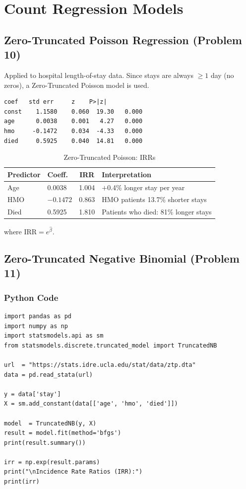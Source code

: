\documentclass[12pt,a4paper]{article}
\begin{document}
\section{Count Regression Models}

\subsection{Zero-Truncated Poisson Regression (Problem 10)}

Applied to hospital length-of-stay data. Since stays are always $\geq 1$ day (no zeros), a Zero-Truncated Poisson model is used.

\begin{lstlisting}[style=outputstyle]
          coef   std err     z    P>|z|
const    1.1580    0.060  19.30   0.000
age      0.0038    0.001   4.27   0.000
hmo     -0.1472    0.034  -4.33   0.000
died     0.5925    0.040  14.81   0.000
\end{lstlisting}

\begin{table}[H]
  \centering
  \caption{Zero-Truncated Poisson: IRRs}
  \begin{tabular}{llcl}
    \toprule
    \textbf{Predictor} & \textbf{Coeff.} & \textbf{IRR} & \textbf{Interpretation} \\
    \midrule
    Age  &  0.0038 & 1.004 & $+$0.4\% longer stay per year \\
    HMO  & $-0.1472$ & 0.863 & HMO patients 13.7\% shorter stays \\
    Died &  0.5925 & 1.810 & Patients who died: 81\% longer stays \\
    \bottomrule
  \end{tabular}
\end{table}

where $\mathrm{IRR} = e^{\hat\beta}$.

\subsection{Zero-Truncated Negative Binomial (Problem 11)}

\subsubsection{Python Code}

\begin{lstlisting}[style=pythonstyle]
import pandas as pd
import numpy as np
import statsmodels.api as sm
from statsmodels.discrete.truncated_model import TruncatedNB

url  = "https://stats.idre.ucla.edu/stat/data/ztp.dta"
data = pd.read_stata(url)

y = data['stay']
X = sm.add_constant(data[['age', 'hmo', 'died']])

model  = TruncatedNB(y, X)
result = model.fit(method='bfgs')
print(result.summary())

irr = np.exp(result.params)
print("\nIncidence Rate Ratios (IRR):")
print(irr)
\end{lstlisting}
\end{document}

